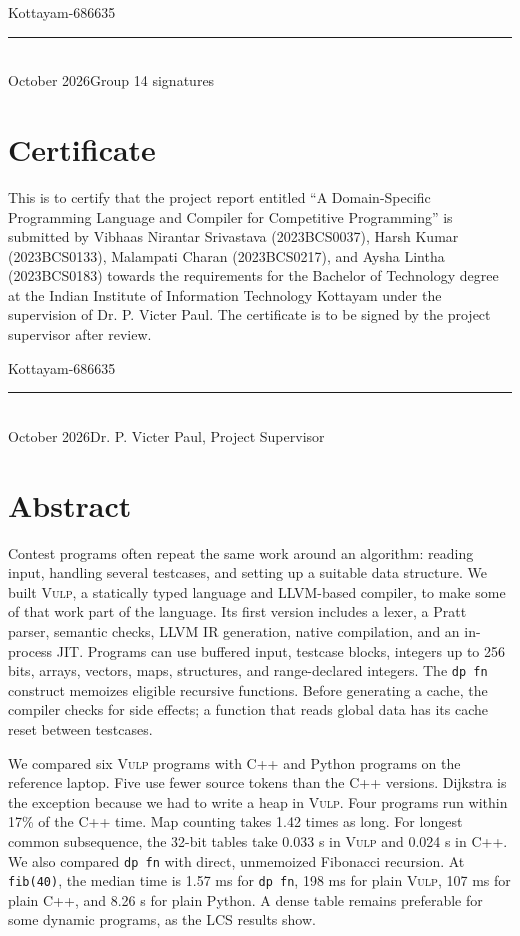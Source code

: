 \documentclass[12pt,a4paper]{report}
\newcommand{\projecttitle}{A Domain-Specific Programming Language and Compiler for Competitive Programming}
\newcommand{\vulp}{\textsc{Vulp}}
\begin{document}
\vspace{2.5cm}
\noindent Kottayam-686635\hfill \rule{6.2cm}{0.4pt}\\
October 2026\hfill Group 14 signatures
\clearpage

\chapter*{Certificate}
This is to certify that the project report entitled ``\projecttitle'' is submitted by Vibhaas Nirantar Srivastava (2023BCS0037), Harsh Kumar (2023BCS0133), Malampati Charan (2023BCS0217), and Aysha Lintha (2023BCS0183) towards the requirements for the Bachelor of Technology degree at the Indian Institute of Information Technology Kottayam under the supervision of Dr. P. Victer Paul. The certificate is to be signed by the project supervisor after review.

\vspace{3cm}
\noindent Kottayam-686635\hfill \rule{6.2cm}{0.4pt}\\
October 2026\hfill Dr. P. Victer Paul, Project Supervisor
\clearpage

\chapter*{Abstract}
Contest programs often repeat the same work around an algorithm: reading input, handling several testcases, and setting up a suitable data structure. We built \vulp{}, a statically typed language and LLVM-based compiler, to make some of that work part of the language. Its first version includes a lexer, a Pratt parser, semantic checks, LLVM IR generation, native compilation, and an in-process JIT. Programs can use buffered input, testcase blocks, integers up to 256 bits, arrays, vectors, maps, structures, and range-declared integers. The \texttt{dp fn} construct memoizes eligible recursive functions. Before generating a cache, the compiler checks for side effects; a function that reads global data has its cache reset between testcases.

We compared six \vulp{} programs with C++ and Python programs on the reference laptop. Five use fewer source tokens than the C++ versions. Dijkstra is the exception because we had to write a heap in \vulp{}. Four programs run within 17\% of the C++ time. Map counting takes 1.42 times as long. For longest common subsequence, the 32-bit tables take 0.033 s in \vulp{} and 0.024 s in C++. We also compared \texttt{dp fn} with direct, unmemoized Fibonacci recursion. At \texttt{fib(40)}, the median time is 1.57 ms for \texttt{dp fn}, 198 ms for plain \vulp{}, 107 ms for plain C++, and 8.26 s for plain Python. A dense table remains preferable for some dynamic programs, as the LCS results show.
\end{document}
